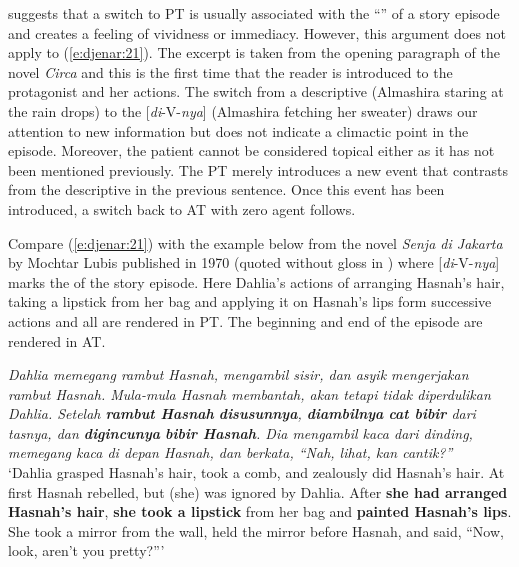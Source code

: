 \documentclass[output=paper
,modfonts
,nonflat]{langsci/langscibook}
\begin{document}
\citet[175]{Cumming1991} suggests that a switch to PT is usually associated with the “” of a story episode and creates a feeling of vividness or immediacy. However, this argument does not apply to (\ref{e:djenar:21}). The excerpt is taken from the opening paragraph of the novel \textit{Circa} \citep{Karina2008} and this is the first time that the reader is introduced to the protagonist and her actions. The switch from a descriptive  (Almashira staring at the rain drops) to the [\textit{di}-V-\textit{nya}]  (Almashira fetching her sweater) draws our attention to new information but does not indicate a climactic point in the episode. Moreover, the patient cannot be considered topical either as it has not been mentioned previously. The PT  merely introduces a new event that contrasts from the descriptive  in the previous sentence. Once this event has been introduced, a switch back to AT with zero agent follows. 

\largerpage
Compare (\ref{e:djenar:21}) with the example below from the novel \textit{Senja di Jakarta} by Mochtar Lubis published in 1970 (quoted without gloss in \citealt[174]{Cumming1991}) where [\textit{di}-V-\textit{nya}] marks the  of the story episode. Here Dahlia’s actions of arranging Hasnah’s hair, taking a lipstick from her bag and applying it on Hasnah’s lips form successive actions and all are rendered in PT. The beginning and end of the episode are rendered in AT.

\begin{exe}
	\ex\label{e:djenar:22}
	\textit{Dahlia memegang rambut Hasnah, mengambil sisir, dan asyik mengerjakan rambut Hasnah. Mula-mula Hasnah membantah, akan tetapi tidak diperdulikan Dahlia. Setelah \textbf{rambut Hasnah} \textbf{disusunnya}, \textbf{diambilnya} \textbf{cat bibir} dari tasnya, dan \textbf{digincunya} \textbf{bibir Hasnah}. Dia mengambil kaca dari dinding, memegang kaca di depan Hasnah, dan berkata, “Nah, lihat, kan cantik?”}\\
	\glt ‘Dahlia grasped Hasnah’s hair, took a comb, and zealously did Hasnah’s hair. At first Hasnah rebelled, but (she) was ignored by Dahlia. After \textbf{she had arranged Hasnah’s hair}, \textbf{she took a lipstick} from her bag and \textbf{painted Hasnah’s lips}. She took a mirror from the wall, held the mirror before Hasnah, and said, “Now, look, aren’t you pretty?”’ 
\end{exe}
\end{document}
